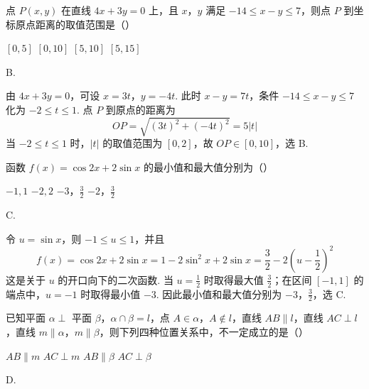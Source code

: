 \begin{problem}
点 \(P(x, y)\) 在直线 \(4x + 3y = 0\) 上，且 \(x\)，\(y\) 满足 \(-14 \leqslant x - y \leqslant 7\)，则点 \(P\) 到坐标原点距离的取值范围是（\quad）

\choices
    {\([0, 5]\)}
    {\([0, 10]\)}
    {\([5, 10]\)}
    {\([5, 15]\)}
\end{problem}

\begin{answer}
B.
\end{answer}

\begin{solution}
由 \(4x+3y=0\)，可设 \(x=3t\)，\(y=-4t\). 此时 \(x-y=7t\)，条件
\(-14\leq x-y\leq7\) 化为 \(-2\leq t\leq1\). 点 \(P\) 到原点的距离为
\[
OP=\sqrt{(3t)^2+(-4t)^2}=5|t|
\]
当 \(-2\leq t\leq1\) 时，\(|t|\) 的取值范围为 \([0,2]\)，故 \(OP\in[0,10]\)，选 B.
\end{solution}

\begin{problem}
函数 \( f(x) = \cos 2x + 2\sin x \) 的最小值和最大值分别为（\quad）

\choices
    {\(-1, 1\)}
    {\(-2, 2\)}
    {\(-3\)，\(\frac{3}{2}\)}
    {\(-2\)，\(\frac{3}{2}\)}
\end{problem}

\begin{answer}
C.
\end{answer}

\begin{solution}
令 \(u=\sin x\)，则 \(-1\leq u\leq1\)，并且
\[
f(x)=\cos2x+2\sin x=1-2\sin^2x+2\sin x=\frac32-2\left(u-\frac12\right)^2
\]
这是关于 \(u\) 的开口向下的二次函数. 当 \(u=\frac12\) 时取得最大值 \(\frac32\)；在区间 \([-1,1]\) 的端点中，\(u=-1\) 时取得最小值 \(-3\). 因此最小值和最大值分别为 \(-3\)，\(\frac32\)，选 C.
\end{solution}

\begin{problem}
已知平面 \(\alpha \perp\) 平面 \(\beta\)，\(\alpha \cap \beta = l\)，点 \(A \in \alpha\)，\(A \notin l\)，直线 \(AB \parallel l\)，直线 \(AC \perp l\)，直线 \(m \parallel \alpha\)，\(m \parallel \beta\)，则下列四种位置关系中，不一定成立的是（\quad）

\choices
    {\(AB \parallel m\)}
    {\(AC \perp m\)}
    {\(AB \parallel \beta\)}
    {\(AC \perp \beta\)}
\end{problem}

\begin{answer}
D.
\end{answer}

